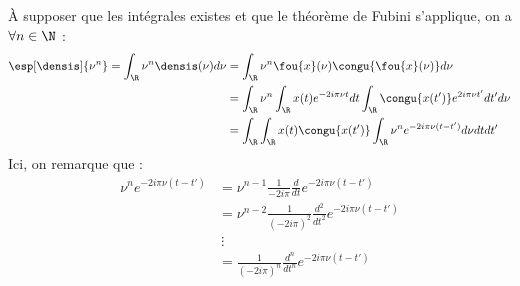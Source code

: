 \begin{demo}
	\`A supposer que les intégrales existes et que le théorème de Fubini s'applique, on a $\forall n\in\N$ :
	\begin{align*}
		\esp[\densis]{\nu^n} = \int_\R \nu^n\densis(\nu) d\nu &= \int_\R \nu^n \fou{x}(\nu)\congu{\fou{x}(\nu)} d\nu \\
		&= \int_\R \nu^n \int_\R x(t)e^{-2i \pi \nu t} dt \int_\R \congu{x(t')}e^{2i \pi \nu t'} dt' d\nu \\
		&= \int_\R \int_\R x(t) \congu{x(t')} \int_\R \nu^n e^{-2i \pi \nu (t-t')} d\nu dt dt' 
	\end{align*}
	Ici, on remarque que :
	\begin{align*}
		\nu^n e^{-2i \pi \nu (t-t')} &= \nu^{n-1}\frac{1}{-2i \pi}\frac{d}{dt}e^{-2i \pi \nu(t-t')} \\
		&= \nu^{n-2}\frac{1}{(-2i \pi)^2}\frac{d^2}{dt^2}e^{-2i \pi \nu(t-t')} \\
		&\ \vdots \\
		&= \frac{1}{(-2i \pi)^n}\frac{d^n}{dt^n}e^{-2i \pi \nu(t-t')}
	\end{align*}
	\\
	

\end{demo}
